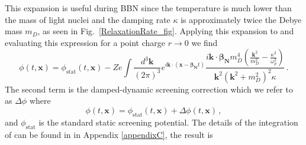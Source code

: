 This expansion is useful during BBN since the temperature is much lower than the mass of light nuclei and the damping rate $\kappa$ is approximately twice the Debye mass $m_D$, as seen in Fig.~\ref{RelaxationRate_fig}. Applying this expansion to  and evaluating this expression for a point charge $r \rightarrow 0$ we find
\begin{equation}\label{eq:ddsint}
\phi(t,\boldsymbol{x}) =\phi_{\text{stat}}(t,\boldsymbol{x})-Ze\int \frac{d^3\boldsymbol{k}}{(2\pi)^3} e^{ i\boldsymbol{k}\cdot(\boldsymbol{x}-\boldsymbol{\beta_{\text{N}}} t)}\frac{i \boldsymbol{k}\cdot \boldsymbol{\beta_{\text{N}}} m_D^4 (\frac{\boldsymbol{k}^2}{m_D^2} - \frac{\kappa^2}{\omega_p^2})}{\boldsymbol{k}^2(\boldsymbol{k}^2+m_D^2)^2\kappa}\,.
\end{equation}
The second term is the damped-dynamic screening correction which we refer to as $\Delta \phi$ where
\begin{equation}\label{eq:pos_point}
\phi(t,\boldsymbol{x}) = \phi_{\text{stat}}(t,\boldsymbol{x}) +\Delta \phi(t,\boldsymbol{x}) \,,
\end{equation}
and $\phi_{\text{stat}}$ is the standard static screening potential. The details of the integration of  can be found in \citep{Grayson:2023flr} in Appendix \ref{appendixC}, the result is
